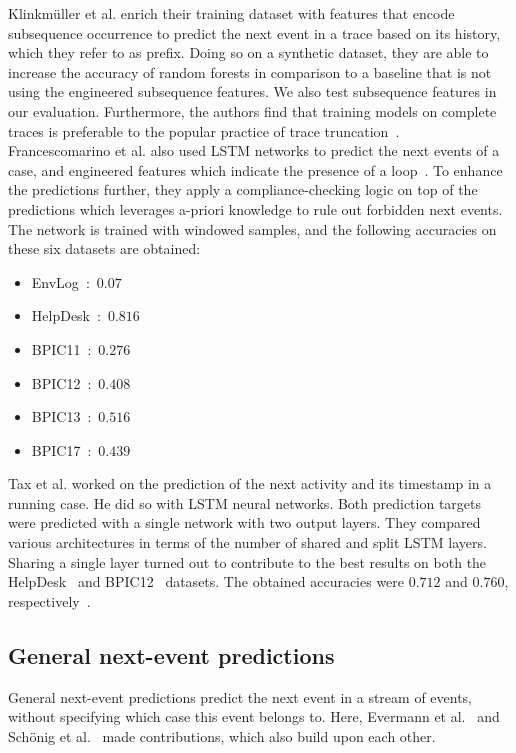 Klinkmüller et al. enrich their training dataset with features that encode subsequence occurrence to predict the next event in a trace based on its history, which they refer to as prefix. Doing so on a synthetic dataset, they are able to increase the accuracy of random forests in comparison to a baseline that is not using the engineered subsequence features.
We also test subsequence features in our evaluation. Furthermore, the authors find that training models on complete traces is preferable to the popular practice of trace truncation~\cite{klinkmuller2018reliablemonitoring}. \\

Francescomarino et al. also used LSTM networks to predict the next events of a case, and engineered features which indicate the presence of a loop~\cite{francescomarino2017}. To enhance the predictions further, they apply a compliance-checking logic on top of the predictions which leverages a-priori knowledge to rule out forbidden next events. The network is trained with windowed samples, and the following accuracies on these six datasets are obtained:

\begin{itemize}
  \item EnvLog~\cite{EnvLog}:~$0.07$
  \item HelpDesk~\cite{Helpdesk}:~$0.816$
  \item BPIC11~\cite{BPIC2011}:~$0.276$
  \item BPIC12~\cite{BPIC2012}:~$0.408$
  \item BPIC13~\cite{BPIC2013}:~$0.516$
  \item BPIC17~\cite{BPIC2017}:~$0.439$
\end{itemize}

Tax et al. worked on the prediction of the next activity and its timestamp in a running case. He did so with LSTM neural networks. Both prediction targets were predicted with a single network with two output layers. They compared various architectures in terms of the number of shared and split LSTM layers. Sharing a single layer turned out to contribute to the best results on both the HelpDesk~\cite{Helpdesk} and BPIC12~\cite{BPIC2012} datasets. The obtained accuracies were $0.712$ and $0.760$, respectively~\cite{tax2017}.

\subsection*{General next-event predictions}
General next-event predictions predict the next event in a stream of events, without specifying which case this event belongs to. Here, Evermann et al.~\cite{evermann2016} and Schönig et al.~\cite{schoenig2018} made contributions, which also build upon each other.

